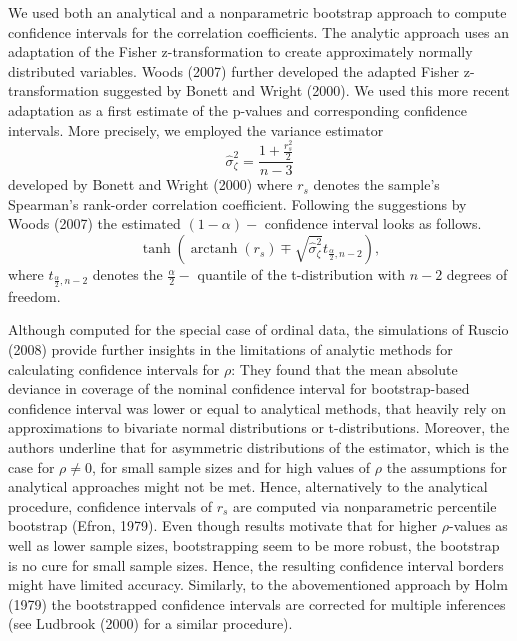 \documentclass[
  english,
  jou,floatsintext]{apa7}
\begin{document}
We used both an analytical and a nonparametric bootstrap approach to compute confidence intervals for the correlation coefficients. The analytic approach uses an adaptation of the Fisher z-transformation to create approximately normally distributed variables. Woods (2007) further developed the adapted Fisher z-transformation suggested by Bonett and Wright (2000). We used this more recent adaptation as a first estimate of the p-values and corresponding confidence intervals. More precisely, we employed the variance estimator
\begin{equation}
\hat{\sigma}^2_{\zeta} = \frac{1 + \frac{r^2_s}{2}}{n - 3} \label{eq:variance}
\end{equation}
developed by Bonett and Wright (2000) where \(r_s\) denotes the sample's Spearman's rank-order correlation coefficient. Following the suggestions by Woods (2007) the estimated \((1- \alpha)-\) confidence interval looks as follows.
\begin{equation}
\tanh \left(\operatorname{arctanh}(r_s)\mp \sqrt{\hat{\sigma}^2_{\zeta}} t_{\frac{\alpha}{2}, n-2} \right), \label{eq:analyticalci}
\end{equation}
where \(t_{\frac{\alpha}{2}, n-2}\) denotes the \(\frac{\alpha}{2}-\) quantile of the t-distribution with \(n-2\) degrees of freedom.

Although computed for the special case of ordinal data, the simulations of Ruscio (2008) provide further insights in the limitations of analytic methods for calculating confidence intervals for \(\rho\): They found that the mean absolute deviance in coverage of the nominal confidence interval for bootstrap-based confidence interval was lower or equal to analytical methods, that heavily rely on approximations to bivariate normal distributions or t-distributions. Moreover, the authors underline that for asymmetric distributions of the estimator, which is the case for \(\rho \neq 0\), for small sample sizes and for high values of \(\rho\) the assumptions for analytical approaches might not be met. Hence, alternatively to the analytical procedure, confidence intervals of \(r_s\) are computed via nonparametric percentile bootstrap (Efron, 1979). Even though results motivate that for higher \(\rho\)-values as well as lower sample sizes, bootstrapping seem to be more robust, the bootstrap is no cure for small sample sizes. Hence, the resulting confidence interval borders might have limited accuracy. Similarly, to the abovementioned approach by Holm (1979) the bootstrapped confidence intervals are corrected for multiple inferences (see Ludbrook (2000) for a similar procedure).
\end{document}
